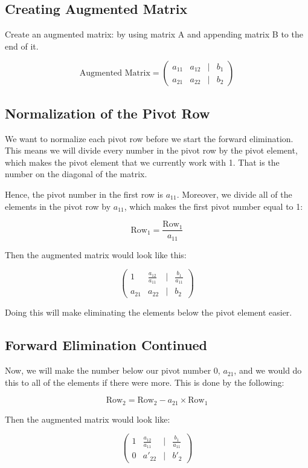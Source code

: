 \documentclass[a4paper]{article}
\begin{document}
\subsection{Creating Augmented Matrix}
{Create an augmented matrix:} by using matrix A and appending matrix B to the end of it.

\[
\text{Augmented Matrix} = \begin{pmatrix}
    a_{11} & a_{12} & | & b_{1} \\
    a_{21} & a_{22} & | & b_{2}
\end{pmatrix}
\]

\subsection{Normalization of the Pivot Row}
We want to normalize each pivot row before we start the forward elimination. This means we will divide every number in the pivot row by the pivot element, which makes the pivot element that we currently work with 1. That is the number on the diagonal of the matrix.


Hence, the pivot number in the first row is $a_{11}$. Moreover, we divide all of the elements in the pivot row by $a_{11}$, which makes the first pivot number equal to 1:

\[
\text{Row}_1 = \frac{\text{Row}_1}{a_{11}}
\]

Then the augmented matrix would look like this:

\[
\begin{pmatrix}
    1 & \frac{a_{12}}{a_{11}} & | & \frac{b_{1}}{a_{11}} \\
    a_{21} & a_{22} & | & b_{2}
\end{pmatrix}
\]

Doing this will make eliminating the elements below the pivot element easier.

\subsection{Forward Elimination Continued}
Now, we will make the number below our pivot number 0, $a_{21}$, and we would do this to all of the elements if there were more. This is done by the following:

\[
\text{Row}_2 = \text{Row}_2 - a_{21} \times \text{Row}_1
\]

Then the augmented matrix would look like:

\[
\begin{pmatrix}
    1 & \frac{a_{12}}{a_{11}} & | & \frac{b_{1}}{a_{11}} \\
    0 & a'_{22} & | & b'_{2}
\end{pmatrix}
\]
\end{document}
